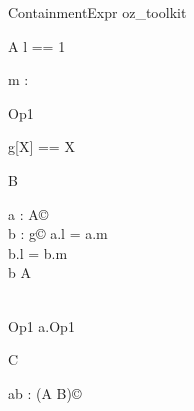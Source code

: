 \begin{zsection}
  \SECTION ContainmentExpr \parents oz\_toolkit
\end{zsection}

\begin{class}{A}
  l == 1\\
  \begin{state}
    m : \nat
  \end{state}
  Op1 \sdef [x? : \nat]
\end{class}

\begin{zed}
  g[X] == X
\end{zed}

\begin{class}{B}
  \begin{state}
   a : A\copyright\\
   b : g\copyright
  \where
    a.l = a.m\\
    b.l = b.m\\
    b \in A\\
  \end{state}\\
  Op1 \sdef a.Op1
\end{class}

\begin{class}{C}
  \begin{state}
    ab : (A \classuni B)\copyright
  \end{state}
\end{class}
